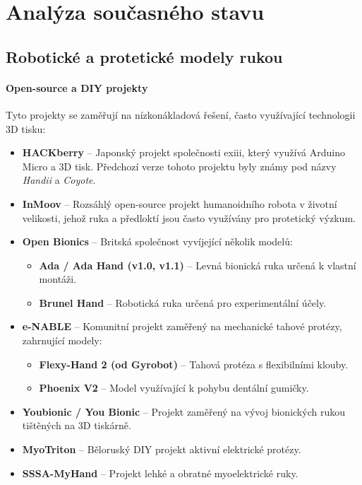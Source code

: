 \chapter{Analýza současného stavu}

\section{Robotické a protetické modely rukou}

\subsubsection{Open-source a DIY projekty}
Tyto projekty se zaměřují na nízkonákladová řešení, často využívající technologii 3D tisku:

\begin{itemize}
    \item \textbf{HACKberry} – Japonský projekt společnosti exiii, který využívá Arduino Micro a 3D tisk. Předchozí verze tohoto projektu byly známy pod názvy \textit{Handii} a \textit{Coyote}.
    \item \textbf{InMoov} – Rozsáhlý open-source projekt humanoidního robota v životní velikosti, jehož ruka a předloktí jsou často využívány pro protetický výzkum.
    \item \textbf{Open Bionics} – Britská společnost vyvíjející několik modelů:
    \begin{itemize}
        \item \textbf{Ada / Ada Hand (v1.0, v1.1)} – Levná bionická ruka určená k vlastní montáži.
        \item \textbf{Brunel Hand} – Robotická ruka určená pro experimentální účely.
    \end{itemize}
    \item \textbf{e-NABLE} – Komunitní projekt zaměřený na mechanické tahové protézy, zahrnující modely:
    \begin{itemize}
        \item \textbf{Flexy-Hand 2 (od Gyrobot)} – Tahová protéza s flexibilními klouby.
        \item \textbf{Phoenix V2} – Model využívající k pohybu dentální gumičky.
    \end{itemize}
    \item \textbf{Youbionic / You Bionic} – Projekt zaměřený na vývoj bionických rukou tištěných na 3D tiskárně.
    \item \textbf{MyoTriton} – Běloruský DIY projekt aktivní elektrické protézy.
    \item \textbf{SSSA-MyHand} – Projekt lehké a obratné myoelektrické ruky.
\end{itemize}

